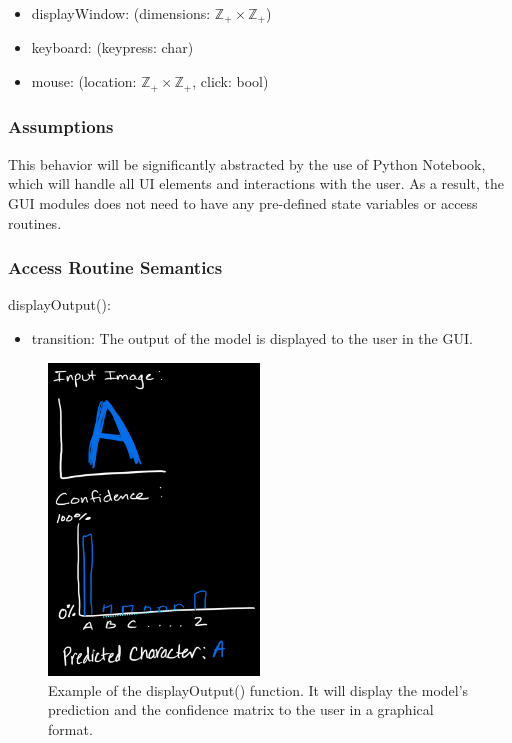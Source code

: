 \documentclass[12pt, titlepage]{article}
\begin{document}
\begin{itemize}
  \item displayWindow: (dimensions: $\mathbb{Z}_+ \times \mathbb{Z}_+$)
  \item keyboard: (keypress: char)
  \item mouse: (location: $\mathbb{Z}_+ \times \mathbb{Z}_+$, click: bool)
\end{itemize}

\subsubsection{Assumptions}

This behavior will be significantly abstracted by the use of Python Notebook,
which will handle all UI elements and interactions with the user. As a result,
the GUI modules does not need to have any pre-defined state variables or access
routines.

\subsubsection{Access Routine Semantics}

\noindent displayOutput():
\begin{itemize}
\item transition: The output of the model is displayed to the user in the GUI.
\end{itemize}

\begin{figure}
\centering
\includegraphics[width=0.5\textwidth]{displayOutput.jpeg}
\caption{Example of the displayOutput() function. It will display the
  model's prediction and the confidence matrix to the user in a graphical
  format.}
\label{fig:displayOutput}
\end{figure}
\end{document}
